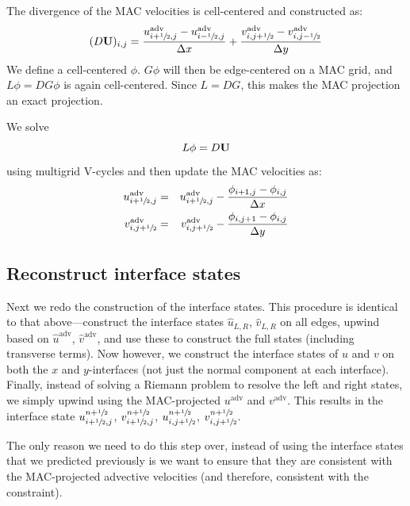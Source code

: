 The divergence of the MAC velocities is cell-centered and constructed as:
\begin{equation}
(D {\bf U})_{i,j} = \frac{u^\mathrm{adv}_{i+{\sfrac{1}{2}},j} - u^\mathrm{adv}_{i-{\sfrac{1}{2}},j}}
                   {\Delta x} +
              \frac{v^\mathrm{adv}_{i,j+{\sfrac{1}{2}}} - v^\mathrm{adv}_{i,j-{\sfrac{1}{2}}}}
                   {\Delta y}
\end{equation}
We define a cell-centered $\phi$.  $G\phi$ will then be edge-centered
on a MAC grid, and $L\phi = DG\phi$ is again cell-centered.  Since $L =
DG$, this makes the MAC projection an exact projection.

We solve
\begin{equation}
L\phi = D{\bf U}
\end{equation}
using multigrid V-cycles and then update the MAC velocities as:
\begin{eqnarray}
u^\mathrm{adv}_{i+\myhalf,j} &=& u^\mathrm{adv}_{i+\myhalf,j} - 
    \frac{\phi_{i+1,j} - \phi_{i,j}}{\Delta x} \\
%
v^\mathrm{adv}_{i,j+\myhalf} &=& v^\mathrm{adv}_{i,j+\myhalf} - 
    \frac{\phi_{i,j+1} - \phi_{i,j}}{\Delta y}
\end{eqnarray}


\subsection{Reconstruct interface states}

Next we redo the construction of the interface states.  This procedure
is identical to that above---construct the interface states
$\hat{u}_{L,R}$, $\hat{v}_{L,R}$ on all edges, upwind based on
$\hat{u}^\mathrm{adv}$, $\hat{v}^\mathrm{adv}$, and use these to
construct the full states (including transverse terms).  Now however,
we construct the interface states of $u$ and $v$ on both the $x$ and
$y$-interfaces (not just the normal component at each interface).
Finally, instead of solving a Riemann problem to resolve the left and
right states, we simply upwind using the MAC-projected
$u^\mathrm{adv}$ and $v^\mathrm{adv}$.  This results in the interface
state $u^{n+{\sfrac{1}{2}}}_{i+{\sfrac{1}{2}},j}$, $v^{n+{\sfrac{1}{2}}}_{i+{\sfrac{1}{2}},j}$, $u^{n+{\sfrac{1}{2}}}_{i,j+{\sfrac{1}{2}}}$,
$v^{n+{\sfrac{1}{2}}}_{i,j+{\sfrac{1}{2}}}$.

The only reason we need to do this step over, instead of using the
interface states that we predicted previously is we want to ensure
that they are consistent with the MAC-projected advective velocities
(and therefore, consistent with the constraint).

